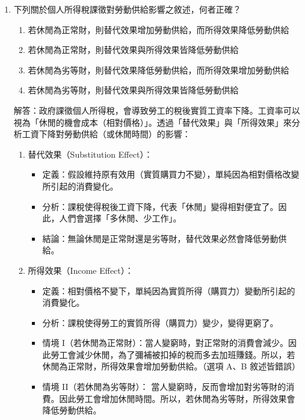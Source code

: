 \documentclass[12pt, a4paper]{article}
\begin{document}
\begin{enumerate}
    \newpage

    \item 下列關於個人所得稅課徵對勞動供給影響之敘述，何者正確？
    \begin{enumerate}[label=\Alph*.]
        \item 若休閒為正常財，則替代效果增加勞動供給，而所得效果降低勞動供給
        \item 若休閒為正常財，則替代效果與所得效果皆降低勞動供給
        \item 若休閒為劣等財，則替代效果降低勞動供給，而所得效果增加勞動供給
        \item 若休閒為劣等財，則替代效果與所得效果皆降低勞動供給
    \end{enumerate}
    解答：政府課徵個人所得稅，會導致勞工的稅後實質工資率下降。工資率可以視為「休閒的機會成本（相對價格）」。透過「替代效果」與「所得效果」來分析工資下降對勞動供給（或休閒時間）的影響：
	\begin{enumerate}[1.]
	    \item 替代效果（Substitution Effect）：
        \begin{itemize}
            \item 定義：假設維持原有效用（實質購買力不變），單純因為相對價格改變所引起的消費變化。
            \item 分析：課稅使得稅後工資下降，代表「休閒」變得相對便宜了。因此，人們會選擇「多休閒、少工作」。
            \item 結論：無論休閒是正常財還是劣等財，替代效果必然會降低勞動供給。
        \end{itemize}
        \item 所得效果（Income Effect）：
        \begin{itemize}
            \item 定義：相對價格不變下，單純因為實質所得（購買力）變動所引起的消費變化。
            \item 分析：課稅使得勞工的實質所得（購買力）變少，變得更窮了。
            \item 情境 I（若休閒為正常財）：當人變窮時，對正常財的消費會減少。因此勞工會減少休閒，為了彌補被扣掉的稅而多去加班賺錢。所以，若休閒為正常財，所得效果會增加勞動供給。（選項 A、B 敘述皆錯誤）
            \item 情境 II（若休閒為劣等財）： 當人變窮時，反而會增加對劣等財的消費。因此勞工會增加休閒時間。所以，若休閒為劣等財，所得效果會降低勞動供給。
        \end{itemize}
	\end{enumerate}


\end{enumerate}
\end{document}
